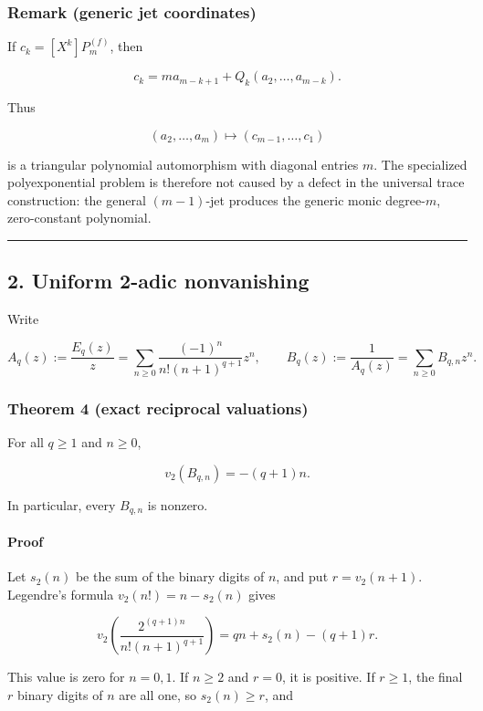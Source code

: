 \subsubsection{Remark (generic jet coordinates)}

If \(c_k=[X^k]P_m^{(f)}\), then

\[
 c_k=ma_{m-k+1}+Q_k(a_2,\ldots,a_{m-k}).
\]

Thus

\[
 (a_2,\ldots,a_m)\longmapsto(c_{m-1},\ldots,c_1)
\]

is a triangular polynomial automorphism with diagonal entries \(m\). The
specialized polyexponential problem is therefore not caused by a defect in
the universal trace construction: the general \((m-1)\)-jet produces the
generic monic degree-\(m\), zero-constant polynomial.

\begin{center}\rule{0.5\linewidth}{0.5pt}\end{center}

\subsection{2. Uniform 2-adic nonvanishing}

Write

\[
 A_q(z):=\frac{E_q(z)}z
 =\sum_{n\geq0}\frac{(-1)^n}{n!(n+1)^{q+1}}z^n,
 \qquad
 B_q(z):=\frac1{A_q(z)}=\sum_{n\geq0}B_{q,n}z^n.
\]

\subsubsection{Theorem 4 (exact reciprocal valuations)}

For all \(q\geq1\) and \(n\geq0\),

\[
 v_2(B_{q,n})=-(q+1)n.
\]

In particular, every \(B_{q,n}\) is nonzero.

\paragraph{Proof}

Let \(s_2(n)\) be the sum of the binary digits of \(n\), and put
\(r=v_2(n+1)\). Legendre's formula \(v_2(n!)=n-s_2(n)\) gives

\[
 v_2\!\left(
 \frac{2^{(q+1)n}}{n!(n+1)^{q+1}}
 \right)
 =qn+s_2(n)-(q+1)r.
\]

This value is zero for \(n=0,1\). If \(n\geq2\) and \(r=0\), it is
positive. If \(r\geq1\), the final \(r\) binary digits of \(n\) are all
one, so \(s_2(n)\geq r\), and

